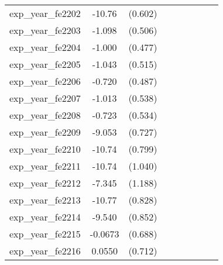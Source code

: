 {\begin{tabular}{l*{4}{cc}}
exp\_year\_fe2202&   -10.76\sym{***}&  (0.602)&                  &         &                  &         &                  &         \\
exp\_year\_fe2203&   -1.098\sym{*}  &  (0.506)&                  &         &                  &         &                  &         \\
exp\_year\_fe2204&   -1.000\sym{*}  &  (0.477)&                  &         &                  &         &                  &         \\
exp\_year\_fe2205&   -1.043\sym{*}  &  (0.515)&                  &         &                  &         &                  &         \\
exp\_year\_fe2206&   -0.720         &  (0.487)&                  &         &                  &         &                  &         \\
exp\_year\_fe2207&   -1.013         &  (0.538)&                  &         &                  &         &                  &         \\
exp\_year\_fe2208&   -0.723         &  (0.534)&                  &         &                  &         &                  &         \\
exp\_year\_fe2209&   -9.053\sym{***}&  (0.727)&                  &         &                  &         &                  &         \\
exp\_year\_fe2210&   -10.74\sym{***}&  (0.799)&                  &         &                  &         &                  &         \\
exp\_year\_fe2211&   -10.74\sym{***}&  (1.040)&                  &         &                  &         &                  &         \\
exp\_year\_fe2212&   -7.345\sym{***}&  (1.188)&                  &         &                  &         &                  &         \\
exp\_year\_fe2213&   -10.77\sym{***}&  (0.828)&                  &         &                  &         &                  &         \\
exp\_year\_fe2214&   -9.540\sym{***}&  (0.852)&                  &         &                  &         &                  &         \\
exp\_year\_fe2215&  -0.0673         &  (0.688)&                  &         &                  &         &                  &         \\
exp\_year\_fe2216&   0.0550         &  (0.712)&                  &         &                  &         &                  &         \\

\end{tabular}}
